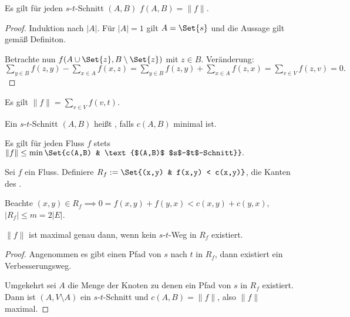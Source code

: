 \begin{lem}
    Es gilt für jeden $s$-$t$-Schnitt $(A, B)$
    \begin{math}
        f(A, B) = \|f\|.
    \end{math}
    \begin{proof}
        Induktion nach $|A|$.
        Für $|A| = 1$ gilt $A = \Set{s}$ und die Aussage gilt gemäß Definiton.

        Betrachte nun $f(A \cup \Set{z}, B \setminus \Set{z})$ mit $z \in B$.
        Veränderung:
        \begin{math}
            \sum_{y \in B}f(z,y) - \sum_{x \in A}f(x,z)
            = \sum_{y \in B}f(z,y) + \sum_{x \in A}f(z,x)
            = \sum_{v \in V}f(z,v)
            = 0.
        \end{math}
    \end{proof}
\end{lem}

\begin{kor}
    Es gilt
    \begin{math}
        \|f\| = \sum_{v \in V} f(v,t).
    \end{math}
\end{kor}

\begin{df}
    Ein $s$-$t$-Schnitt $(A,B)$ heißt , falls $c(A,B)$ minimal ist.
\end{df}

Es gilt für jeden Fluss $f$ stets
\begin{math}
    \|f\| \le \min \Set{c(A,B) & \text{$(A,B)$ $s$-$t$-Schnitt}}.
\end{math}

\begin{df}
    Sei $f$ ein Fluss.
    Definiere $R_f := \Set{(x,y) & f(x,y) < c(x,y)}$, die Kanten des .
    \begin{note}
        Beachte
        \begin{math}
            (x,y) \in R_f
            \implies
            0 = f(x,y) + f(y,x)
            < c(x,y) + c(y,x),
        \end{math}
        $|R_f| \le m = 2|E|$.
    \end{note}
\end{df}

\begin{lem}
    $\|f\|$ ist maximal genau dann, wenn kein $s$-$t$-Weg in $R_f$ existiert.
    \begin{proof}
        Angenommen es gibt einen Pfad von $s$ nach $t$ in $R_f$, dann existiert ein Verbesserungsweg.

        Umgekehrt sei $A$ die Menge der Knoten zu denen ein Pfad von $s$ in $R_f$ existiert.
        Dann ist $(A, V \setminus A)$ ein $s$-$t$-Schnitt und $c(A,B) = \|f\|$, also $\|f\|$ maximal.
    \end{proof}
\end{lem}


